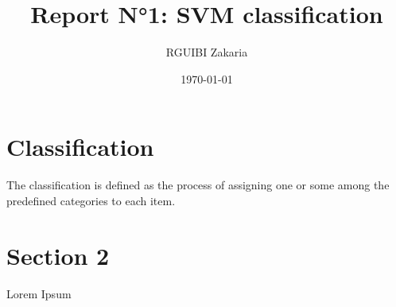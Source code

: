 \documentclass[11pt]{article}
\title{ Report N°1: SVM classification}
\author{ RGUIBI Zakaria }
\date{\today}
\begin{document}
\maketitle	
\pagebreak



\section{Classification }

The classification is defined as the process of assigning one or some among the predefined categories to each item. \cite{mlfoundation}



\pagebreak
\section{Section 2}
Lorem Ipsum \\

\end{document}

